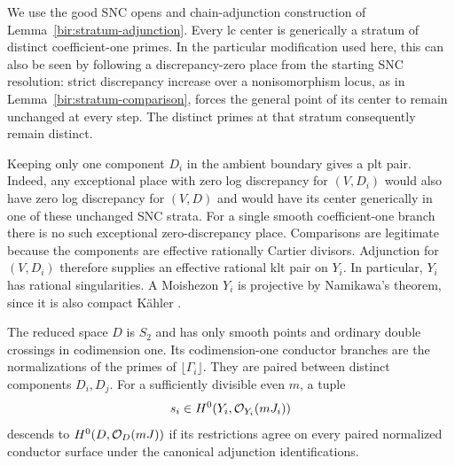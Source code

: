 We use the good SNC opens and chain-adjunction construction of
Lemma~\ref{bir:stratum-adjunction}.  Every lc center is
generically a stratum of distinct coefficient-one primes.  In the
particular modification used here, this can also be seen by following a
discrepancy-zero place from the starting SNC resolution: strict
discrepancy increase over a nonisomorphism locus, as in
Lemma~\ref{bir:stratum-comparison}, forces the general point
of its center to remain unchanged at every step.  The distinct primes at
that stratum consequently remain distinct.

Keeping only one component $D_i$ in the ambient boundary gives a plt
pair.  Indeed, any exceptional place with zero log discrepancy for
$(V,D_i)$ would also have zero log discrepancy for $(V,D)$ and would
have its center generically in one of these unchanged SNC strata.  For a
single smooth coefficient-one branch there is no such exceptional
zero-discrepancy place.  Comparisons are legitimate because the
components are effective rationally Cartier divisors.  Adjunction for
$(V,D_i)$ therefore supplies an effective rational klt pair on $Y_i$.
In particular, $Y_i$ has rational singularities.  A Moishezon $Y_i$ is
projective by Namikawa's theorem, since it is also compact K\"ahler
\cite{NamikawaProjectivity}.

\begin{lemma}
\label{floor:descent}
The reduced space $D$ is $S_2$ and has only smooth points and ordinary
double crossings in codimension one.  Its codimension-one conductor
branches are the normalizations of the primes of
$\lfloor\Gamma_i\rfloor$.  They are paired between distinct components
$D_i,D_j$.  For a sufficiently divisible even $m$, a tuple
\[
 s_i\in H^0(Y_i,\mathcal{O}_{Y_i}(mJ_i))
\]
descends to $H^0(D,\mathcal{O}_D(mJ))$ if its restrictions agree on every paired
normalized conductor surface under the canonical adjunction
identifications.
\end{lemma}

